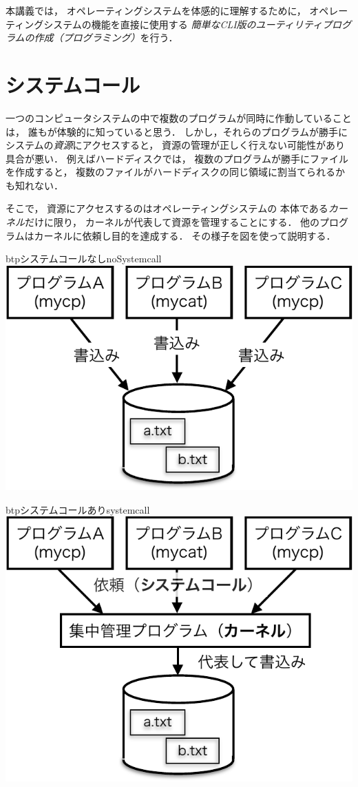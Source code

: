 本講義では，
オペレーティングシステムを体感的に理解するために，
オペレーティングシステムの機能を直接に使用する
\emph{簡単なCLI版のユーティリティプログラムの作成（プログラミング）}を行う．

\section{システムコール}
一つのコンピュータシステムの中で複数のプログラムが同時に作動していることは，
誰もが体験的に知っていると思う．
しかし，それらのプログラムが勝手にシステムの\emph{資源}にアクセスすると，
資源の管理が正しく行えない可能性があり具合が悪い．
例えばハードディスクでは，
複数のプログラムが勝手にファイルを作成すると，
複数のファイルがハードディスクの同じ領域に割当てられるかも知れない．

そこで，
資源にアクセスするのはオペレーティングシステムの
本体である\emph{カーネル}だけに限り，
カーネルが代表して資源を管理することにする．
他のプログラムはカーネルに依頼し目的を達成する．
その様子を図を使って説明する．

\begin{myfig}{btp}{システムコールなし}{noSystemcall}
\includegraphics[scale=0.8]{Fig/noSystemcall-crop.pdf}
\end{myfig}

\begin{myfig}{btp}{システムコールあり}{systemcall}
\includegraphics[scale=0.8]{Fig/systemcall-crop.pdf}
\end{myfig}

